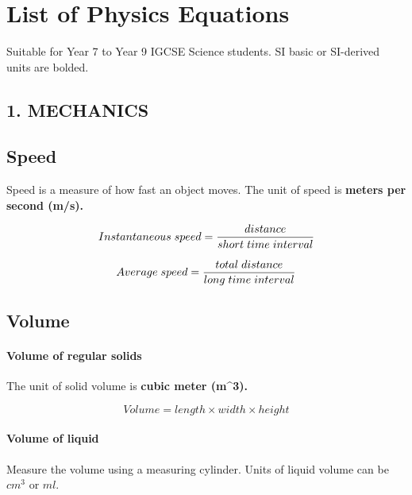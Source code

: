 \documentclass{report}
\begin{document}
\chapter*{List of Physics Equations}
Suitable for Year 7 to Year 9 IGCSE Science students. SI basic or SI-derived units are bolded. 

\medskip

\begin{flushleft}

\section*{1. MECHANICS}

\section*{Speed}
\normalfont Speed is a measure of how fast an object moves. The unit of speed is \bf{meters per second (m/s)}.

\begin{equation}
Instantaneous \hspace{1mm} speed = \frac{distance}{short \hspace{1mm} time \hspace{1mm} interval}
\end{equation}

\begin{equation}
Average \hspace{1mm} speed = \frac{total \hspace{1mm}  distance}{long \hspace{1mm} time \hspace{1mm} interval}
\end{equation}

\section*{Volume}
\subsubsection*{Volume of regular solids}
\normalfont The unit of solid volume is \bf{cubic meter (m^3)}.

\begin{equation}
Volume = length \times width \times height
\end{equation} 

\subsubsection*{Volume of liquid}
\normalfont Measure the volume using a measuring cylinder. Units of liquid volume can be $cm^3$ or $ml$.


\end{flushleft}
\end{document}
